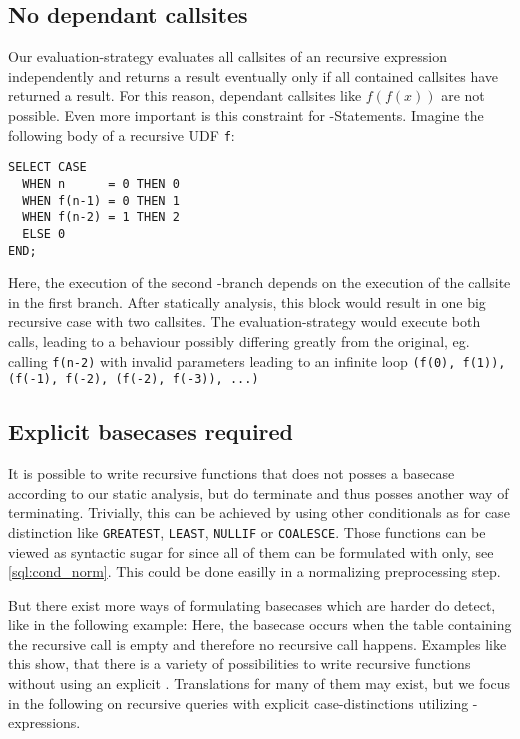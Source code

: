 \subsection{No dependant callsites}
Our evaluation-strategy evaluates all callsites of an recursive expression independently and returns a result eventually only if all contained callsites have returned a result. For this reason, dependant callsites like $f(f(x))$ are not possible. Even more important is this constraint for \CASE-Statements. Imagine the following body of a recursive UDF \texttt{f}:
\begin{verbatim} 
SELECT CASE
  WHEN n      = 0 THEN 0
  WHEN f(n-1) = 0 THEN 1
  WHEN f(n-2) = 1 THEN 2
  ELSE 0
END;
\end{verbatim}
Here, the execution of the second \CASE-branch depends on the execution of the callsite in the first branch. After statically analysis, this block would result in one big recursive case with two callsites. The evaluation-strategy would execute both calls, leading to a behaviour possibly differing greatly from the original, eg. calling \texttt{f(n-2)} with invalid parameters leading to an infinite loop \texttt{(f(0), f(1)), (f(-1), f(-2), (f(-2), f(-3)), ...)}

\subsection{Explicit basecases required}
It is possible to write recursive functions that does not posses a basecase according to our static analysis, but do terminate and thus posses another way of terminating. Trivially, this can be achieved by using other conditionals as \CASE for case distinction like \texttt{GREATEST}, \texttt{LEAST}, \texttt{NULLIF} or \texttt{COALESCE}. Those functions can be viewed as syntactic sugar for \CASE since all of them can be formulated with \CASE only, see \ref{sql:cond_norm}. This could be done easilly in a normalizing preprocessing step.

But there exist more ways of formulating basecases which are harder do detect, like in the following example:
Here, the basecase occurs when the table containing the recursive call is empty and therefore no recursive call happens. Examples like this show, that there is a variety of possibilities to write recursive functions without using an explicit \CASE. Translations for many of them may exist, but we focus in the following on recursive queries with explicit case-distinctions utilizing \CASE-expressions.

